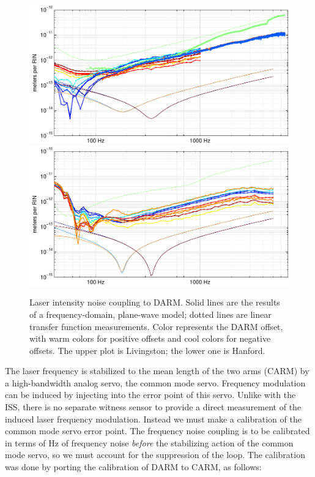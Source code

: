 \begin{figure}[]   %
\includegraphics[]{figures/laserAM-L1.pdf}
\includegraphics[]{figures/laserAM-H1.pdf}
\caption[Laser intensity noise coupling (measured and modeled)]{Laser intensity noise coupling to DARM.
  Solid lines are the results of a frequency-domain, plane-wave model; dotted lines are linear transfer function measurements.  Color represents the DARM offset, with warm colors for positive offsets and cool colors for negative offsets.  The upper plot is Livingston; the lower one is Hanford.}
\end{figure}

The laser frequency is stabilized to the mean length of the two arms
(CARM) by a high-bandwidth analog servo, the common mode servo.
Frequency modulation can be induced by injecting into the error point
of this servo.  Unlike with the ISS, there is no separate witness
sensor to provide a direct measurement of the induced laser frequency
modulation.  Instead we must make a calibration of the common mode
servo error point.  The frequency noise coupling is to be calibrated
in terms of Hz of frequency noise \emph{before} the stabilizing action
of the common mode servo, so we must account for the suppression of
the loop.  The calibration was done by porting the calibration of DARM
to CARM, as follows:

